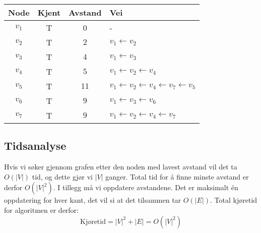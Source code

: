 \begin{example}
\begin{center}
\begin{tabular}{c | c | c | l}
	 Node   & Kjent & Avstand & Vei                                                                 \\ \hline
	$ v_1 $ & T     & 0       & -                                                                   \\
	$ v_2 $ & T     & $ 2 $   & $ v_1 \leftarrow v_2 $                                              \\
	$ v_3 $ & T     & $ 4 $   & $ v_1 \leftarrow v_3 $                                              \\
	$ v_4 $ & T     & $ 5 $   & $ v_1 \leftarrow v_2 \leftarrow v_4 $                               \\
	$ v_5 $ & T     & $ 11 $  & $ v_1 \leftarrow v_2 \leftarrow v_4 \leftarrow v_7 \leftarrow v_5 $ \\
	$ v_6 $ & T     & $ 9 $   & $ v_1 \leftarrow v_3 \leftarrow v_6 $                               \\
	$ v_7 $ & T     & $ 9 $   & $ v_1 \leftarrow v_2 \leftarrow v_4 \leftarrow v_7 $
\end{tabular}
\end{center}
\end{example}

\subsection{Tidsanalyse}
Hvis vi søker gjennom grafen etter den noden med lavest avstand vil det ta $ O(|V|) $ tid, og dette gjør vi $ |V| $ ganger. Total tid for å finne minste avstand er derfor $ O(|V|^2) $. I tillegg må vi oppdatere avstandene. Det er maksimalt én oppdatering for hver kant, det vil si at det tilsammen tar $ O(|E|) $. Total kjøretid for algoritmen er derfor:
\[ \text{Kjøretid} = |V|^2 + |E| = O\left(|V|^2\right) \]
